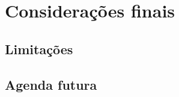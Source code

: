 \section{Considerações finais}
\label{cap:consideracoes}
\aescrever
\subsection{Limitações}
\aescrever
\subsection{Agenda futura}
\aescrever
